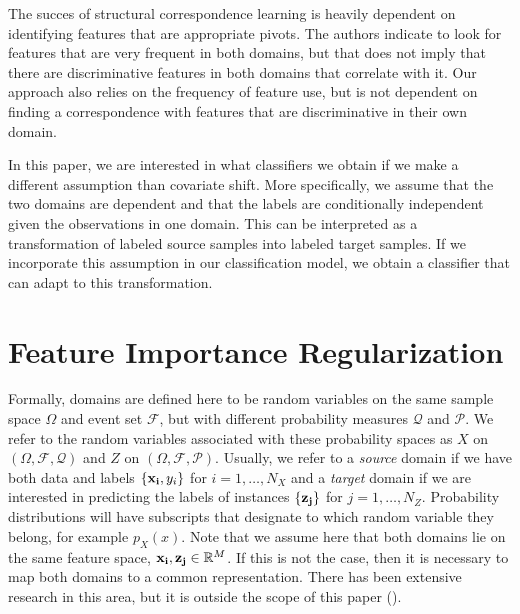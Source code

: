 \documentclass[twoside,11pt]{article}
\begin{document}
The succes of structural correspondence learning is heavily dependent on identifying features that are appropriate pivots. The authors indicate to look for features that are very frequent in both domains, but that does not imply that there are discriminative features in both domains that correlate with it. Our approach also relies on the frequency of feature use, but is not dependent on finding a correspondence with features that are discriminative in their own domain.

In this paper, we are interested in what classifiers we obtain if we make a different assumption than covariate shift. More specifically, we assume that the two domains are dependent and that the labels are conditionally independent given the observations in one domain. This can be interpreted as a transformation of labeled source samples into labeled target samples. If we incorporate this assumption in our classification model, we obtain a classifier that can adapt to this transformation.

\section{Feature Importance Regularization}
Formally, domains are defined here to be random variables on the same sample space $\Omega$ and event set $\mathcal{F}$, but with different probability measures $\mathcal{Q}$ and $\mathcal{P}$. We refer to the random variables associated with these probability spaces as $X$ on $(\Omega, \mathcal{F}, \mathcal{Q})$ and ${Z}$ on $(\Omega, \mathcal{F}, \mathcal{P})$. Usually, we refer to a \emph{source} domain if we have both data and labels $\{{\bf x_{i}}, y_{i}\}$ for  $i = 1,\dots,N_{X}$ and a \emph{target} domain if we are interested in predicting the labels of instances $\{{\bf z_{j}}\}$ for $j = 1,\dots,N_{Z}$. Probability distributions will have subscripts that designate to which random variable they belong, for example $p_{X}(x)$. Note that we assume here that both domains lie on the same feature space, ${\bf x_{i}, z_{j}} \in \mathbb{R}^{M}$. If this is not the case, then it is necessary to map both domains to a common representation. There has been extensive research in this area, but it is outside the scope of this paper (\citealp{ben2007analysis, shao2014generalized}). 
\end{document}
